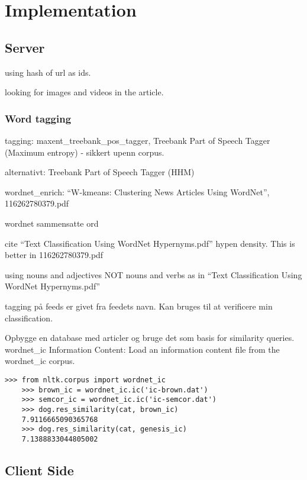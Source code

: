 \chapter{Implementation} %
\label{ch:implementation}


\section{Server}

using hash of url as ids.

looking for images and videos in the article.

\subsection{Word tagging}
tagging: maxent\_treebank\_pos\_tagger, Treebank Part of Speech Tagger (Maximum entropy) - sikkert upenn corpus.

alternativt: Treebank Part of Speech Tagger (HHM)


wordnet\_enrich: ``W-kmeans: Clustering News Articles Using WordNet'', 116262780379.pdf

wordnet sammensatte ord

cite ``Text Classification Using WordNet Hypernyms.pdf''
hypen density. This is better in 116262780379.pdf

using nouns and adjectives NOT nouns and verbs as in ``Text Classification Using WordNet Hypernyms.pdf''


tagging på feeds er givet fra feedets navn. Kan bruges til at verificere min classification.



Opbygge en database med articler og bruge det som basis for similarity queries.
wordnet\_ic Information Content: Load an information content file from the wordnet\_ic corpus.
\begin{lstlisting}[caption=cap,label=lst:lab,float=htbp]
	>>> from nltk.corpus import wordnet_ic
	>>> brown_ic = wordnet_ic.ic('ic-brown.dat')
	>>> semcor_ic = wordnet_ic.ic('ic-semcor.dat')
	>>> dog.res_similarity(cat, brown_ic)
	7.9116665090365768
	>>> dog.res_similarity(cat, genesis_ic)
	7.1388833044805002
\end{lstlisting}



\section{Client Side}

